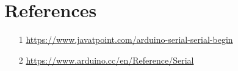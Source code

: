 \documentclass[12pt]{article}
\begin{document}
\newpage
\section*{References}
\begin{enumerate}
  \item [1] \href{https://www.javatpoint.com/arduino-serial-serial-begin}{https://www.javatpoint.com/arduino-serial-serial-begin}
  \item [2] \href{https://www.arduino.cc/en/Reference/Serial}{https://www.arduino.cc/en/Reference/Serial}



\end{enumerate}
\end{document}
